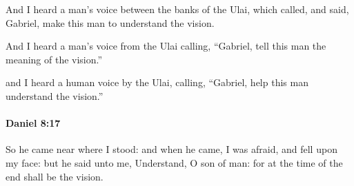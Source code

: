 			\begin{versebox}
					\item[BHS] 
					\item[LXX] 
					\item[ASV] And I heard a man's voice between the banks of the Ulai, which called, and said, Gabriel, make this man to understand the vision.
					\item[NIV] And I heard a man’s voice from the Ulai calling, “Gabriel, tell this man the meaning of the vision.”
					\item[NRSV] and I heard a human voice by the Ulai, calling, “Gabriel, help this man understand the vision.”
			\end{versebox}

		\paragraph{Daniel 8:17} %
			\label{DANIEL-8-17}

			So he came near where I stood: and when he came, I was afraid, and fell upon my face: but he said unto me, Understand, O son of man: for at the time of the end shall be the vision.

